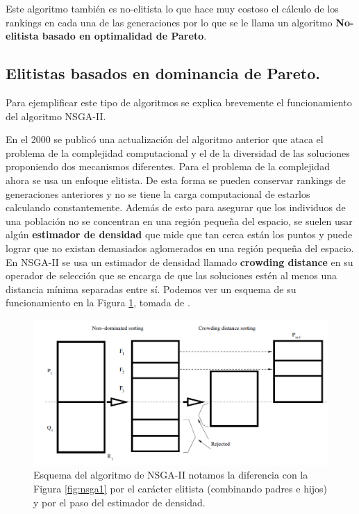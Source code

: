 
Este algoritmo también es no-elitista lo que hace muy costoso el cálculo de los rankings en cada una de las generaciones por lo que se le llama un algoritmo \textbf{No-elitista basado en optimalidad de Pareto}.

\subsection*{Elitistas basados en dominancia de Pareto.} \label{sec:nsga2}

Para ejemplificar este tipo de algoritmos se explica brevemente el funcionamiento del algoritmo NSGA-II.  

En el 2000 se publicó \cite{debFastElitistNondominated2000} una actualización del algoritmo anterior que ataca el problema de la complejidad computacional y el de la diversidad de las soluciones proponiendo dos mecanismos diferentes. Para el problema de la complejidad ahora se usa un enfoque elitista. De esta forma se pueden conservar rankings de generaciones anteriores y no se tiene la carga computacional de estarlos calculando constantemente. Además de esto para asegurar que los individuos de una población no se concentran en una región pequeña del espacio, se suelen usar algún \textbf{estimador de densidad} que mide que tan cerca están los puntos y puede lograr que no existan demasiados aglomerados en una región pequeña del espacio. En NSGA-II se usa un estimador de densidad llamado \textbf{crowding distance} en su operador de selección que se encarga de que las soluciones estén al menos una distancia mínima separadas entre sí. Podemos ver un esquema de su funcionamiento en la Figura \ref{fig:nsga2}, tomada de \cite{coelloEvolutionaryAlgorithmsSolving}.

\begin{figure}[H]
    \centering
    \includegraphics[width=\textwidth]{Figuras/nsga2.png}
    \caption[NSGA-II]{Esquema del algoritmo de NSGA-II notamos la diferencia con la Figura \ref{fig:nsga1} por el carácter elitista (combinando padres e hijos) y por el paso del estimador de densidad.}
    \label{fig:nsga2}
\end{figure}

